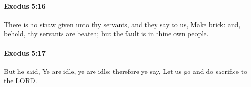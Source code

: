		\paragraph{Exodus 5:16} %
			\label{EXODUS-5-16}

			There is no straw given unto thy servants, and they say to us, Make brick: and, behold, thy servants are beaten; but the fault is in thine own people.


		\paragraph{Exodus 5:17} %
			\label{EXODUS-5-17}

			But he said, Ye are idle, ye are idle: therefore ye say, Let us go and do sacrifice to the LORD.


